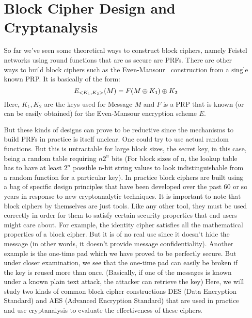 \section{Block Cipher Design and Cryptanalysis}
\label{sec:cryptanalysis}

So far we've seen some theoretical ways to construct block ciphers, namely Feistel networks using round functions that are as secure are PRFs. There are other ways to build block ciphers such as the Even-Mansour~\cite{EvenMansour} construction from a single known PRP. It is basically of the form: 
\[ E_{<K_1, K_2>}(M) = F(M {\:\oplus\:} K_1) {\:\oplus\:} K_2 \] 
Here, \( K_1, K_2 \) are the keys used for Message \(M\) and \(F\) is a PRP that is known (or can be easily obtained) for the Even-Mansour encryption scheme \(E\). 
\par But these kinds of designs can prove to be reductive since the mechanisms to build PRFs in practice is itself unclear. One could try to use actual random functions. But this is untractable for large block sizes,  the secret key, in this case, being a random table requiring $n2^n$ bits
(For block sizes of n, the lookup table has to have at least $2^n$ possible n-bit string values to look indistinguishable from a random function for
a particular key). \newline
In practice block ciphers are built using a bag of specific design principles that have been developed over the past 60 or so years in response to new cryptoanalytic techniques. It is important to note that block ciphers by themselves are just tools. Like any other tool, they must be used correctly in order for them to satisfy certain security properties that end users might care about. \newline
For example, the identity cipher satisfies all the mathematical properties of a block cipher. But it is of no real use since it doesn't hide
the message (in other words, it doesn't provide message confidentiality). \newline
Another example is the one-time pad which we have proved to be perfectly secure. But under closer examination, we see that the one-time pad can easily be broken if the key is reused more than once. (Basically, if one of the messages is known under a known plain text attack, the attacker can retrieve the key) \newline
Here, we will study two kinds of common block cipher constructions DES (Data Encryption Standard) and AES (Advanced Encryption Standard) that are used in practice and use cryptanalysis to evaluate the effectiveness of these ciphers.\newline \newline

